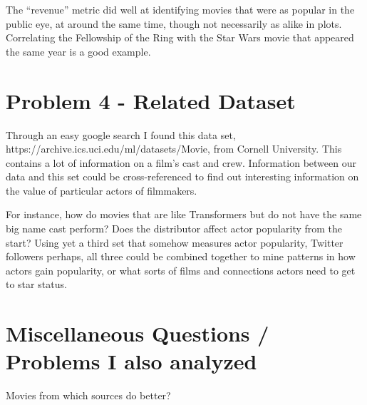 \documentclass[letterpaper,10pt,english]{/usr/local/lib/python2.7/dist-packages/sphinx/texinputs/sphinxhowto}
\begin{document}
The ``revenue'' metric did well at identifying movies that were as
popular in the public eye, at around the same time, though not
necessarily as alike in plots. Correlating the Fellowship of the Ring
with the Star Wars movie that appeared the same year is a good example.\part{Problem 4 - Related Dataset}Through an easy google search I found this data set,
https://archive.ics.uci.edu/ml/datasets/Movie, from Cornell University.
This contains a lot of information on a film's cast and crew.
Information between our data and this set could be cross-referenced to
find out interesting information on the value of particular actors of
filmmakers.

For instance, how do movies that are like Transformers but do not have
the same big name cast perform? Does the distributor affect actor
popularity from the start? Using yet a third set that somehow measures
actor popularity, Twitter followers perhaps, all three could be combined
together to mine patterns in how actors gain popularity, or what sorts
of films and connections actors need to get to star status.\part{Miscellaneous Questions / Problems I also analyzed}Movies from which sources do better?

\end{document}
